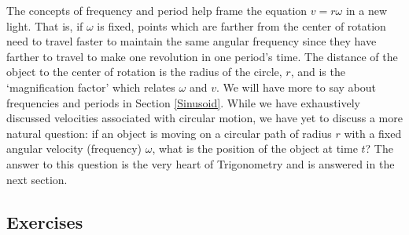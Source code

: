 \documentclass[12pt]{ximera}
\begin{document}
The concepts of frequency and period help frame the equation $v = r \omega$ in a new light.  That is, if $\omega$ is fixed, points which are farther from the center of rotation need to travel faster to maintain the same angular frequency since they have farther to travel to make one revolution in one period's time.  The distance of the object to the center of rotation is the radius of the circle, $r$, and is the `magnification factor' which relates $\omega$ and $v$. We will have more to say about frequencies and periods in Section \ref{Sinusoid}.  While we have exhaustively discussed velocities associated with circular motion, we have yet to discuss a more natural question: if an object is moving on a circular path of radius $r$ with a fixed angular velocity (frequency) $\omega$, what is the position of the object at time $t$?  The answer to this question is the very heart of Trigonometry and is answered in the next section.   



\subsection{Exercises}
\end{document}

